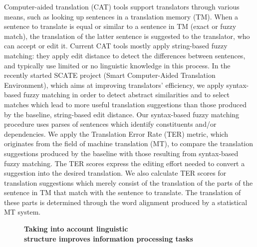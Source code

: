\documentclass[10pt, a4paper, twopage, headinclude, footinclude, BCOR5mm]{book}
\begin{document}
\begin{table}[t!]
\end{table} 
\noindent
Computer-aided translation (CAT) tools support translators through various means, such as looking up sentences in a translation memory (TM). When a sentence to translate is equal or similar to a sentence in TM (exact or fuzzy match), the translation of the latter sentence is suggested to the translator, who can accept or edit it. Current CAT tools mostly apply string-based fuzzy matching: they apply edit distance to detect the differences between sentences, and typically use limited or no linguistic knowledge in this process. In the recently started SCATE project (Smart Computer-Aided Translation Environment), which aims at improving translators’ efficiency, we apply syntax-based fuzzy matching in order to detect abstract similarities and to select matches which lead to more useful translation suggestions than those produced by the baseline, string-based edit distance. Our syntax-based fuzzy matching procedure uses parses of sentences which identify constituents and/or dependencies. We apply the Translation Error Rate (TER) metric, which originates from the field of machine translation (MT), to compare the translation suggestions produced by the baseline with those resulting from syntax-based fuzzy matching. The TER scores express the editing effort needed to convert a suggestion into the desired translation. We also calculate TER scores for translation suggestions which merely consist of the translation of the parts of the sentence in TM that match with the sentence to translate. The translation of these parts is determined through the word alignment produced by a statistical MT system.  

\newpage

\begin{figure}[t!]
\centering
\large\textbf{Taking into account linguistic \\ structure improves information processing tasks}
\vspace*{0.5cm}
\end{figure}
\end{document}
